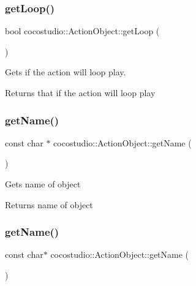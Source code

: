 \subsubsection{\texorpdfstring{get\+Loop()}{getLoop()}\hspace{0.1cm}{\footnotesize\ttfamily [2/2]}}
{\footnotesize\ttfamily bool cocostudio\+::\+Action\+Object\+::get\+Loop (\begin{DoxyParamCaption}{ }\end{DoxyParamCaption})}

Gets if the action will loop play.

\begin{DoxyReturn}{Returns}
that if the action will loop play 
\end{DoxyReturn}
\mbox{\label{classcocostudio_1_1ActionObject_a7f0034620aec8f124b81e33c0e6610be}} 
\subsubsection{\texorpdfstring{get\+Name()}{getName()}\hspace{0.1cm}{\footnotesize\ttfamily [1/2]}}
{\footnotesize\ttfamily const char $\ast$ cocostudio\+::\+Action\+Object\+::get\+Name (\begin{DoxyParamCaption}{ }\end{DoxyParamCaption})}

Gets name of object

\begin{DoxyReturn}{Returns}
name of object 
\end{DoxyReturn}
\mbox{\label{classcocostudio_1_1ActionObject_a29734f75e6995d590528cdf02ea6dafc}} 
\subsubsection{\texorpdfstring{get\+Name()}{getName()}\hspace{0.1cm}{\footnotesize\ttfamily [2/2]}}
{\footnotesize\ttfamily const char$\ast$ cocostudio\+::\+Action\+Object\+::get\+Name (\begin{DoxyParamCaption}{ }\end{DoxyParamCaption})}

